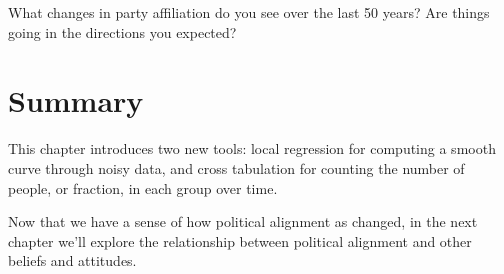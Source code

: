 What changes in party affiliation do you see over the last 50 years? Are
things going in the directions you expected?

\section{Summary}\label{summary}

This chapter introduces two new tools: local regression for computing a
smooth curve through noisy data, and cross tabulation for counting the
number of people, or fraction, in each group over time.

Now that we have a sense of how political alignment as changed, in the
next chapter we'll explore the relationship between political alignment
and other beliefs and attitudes.
